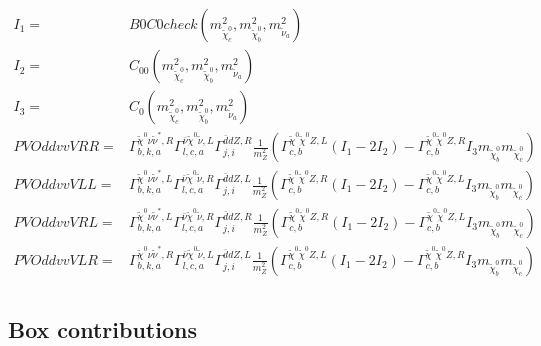 \documentclass[A4,landscape]{article}
\begin{document}
\begin{align} 
I_1= & B0C0check(m^2_{\tilde{\chi}^0_{{c}}}, m^2_{\tilde{\chi}^0_{{b}}}, m^2_{\tilde{\nu}_{{a}}}) \\ 
I_2= & C_{00}(m^2_{\tilde{\chi}^0_{{c}}}, m^2_{\tilde{\chi}^0_{{b}}}, m^2_{\tilde{\nu}_{{a}}}) \\ 
I_3= & C_0(m^2_{\tilde{\chi}^0_{{c}}}, m^2_{\tilde{\chi}^0_{{b}}}, m^2_{\tilde{\nu}_{{a}}}) \\ 
  PVOddvvVRR= &  \Gamma^{\tilde{\chi}^0 \nu \tilde{\nu}^*,R}_{b, k, a} \Gamma^{\bar{\nu}\tilde{\chi}^0 \tilde{\nu} ,L}_{l, c, a} \Gamma^{\bar{d}d Z ,R}_{j, i} \frac{1}{m^2_{Z}} (\Gamma^{\tilde{\chi}^0 \tilde{\chi}^0 Z ,L}_{c, b} (I_1 - 2 I_2) - \Gamma^{\tilde{\chi}^0 \tilde{\chi}^0 Z ,R}_{c, b} I_3 m_{\tilde{\chi}^0_{{b}}} m_{\tilde{\chi}^0_{{c}}}) \\ 
  PVOddvvVLL= &  \Gamma^{\tilde{\chi}^0 \nu \tilde{\nu}^*,L}_{b, k, a} \Gamma^{\bar{\nu}\tilde{\chi}^0 \tilde{\nu} ,R}_{l, c, a} \Gamma^{\bar{d}d Z ,L}_{j, i} \frac{1}{m^2_{Z}} (\Gamma^{\tilde{\chi}^0 \tilde{\chi}^0 Z ,R}_{c, b} (I_1 - 2 I_2) - \Gamma^{\tilde{\chi}^0 \tilde{\chi}^0 Z ,L}_{c, b} I_3 m_{\tilde{\chi}^0_{{b}}} m_{\tilde{\chi}^0_{{c}}}) \\ 
  PVOddvvVRL= &  \Gamma^{\tilde{\chi}^0 \nu \tilde{\nu}^*,L}_{b, k, a} \Gamma^{\bar{\nu}\tilde{\chi}^0 \tilde{\nu} ,R}_{l, c, a} \Gamma^{\bar{d}d Z ,R}_{j, i} \frac{1}{m^2_{Z}} (\Gamma^{\tilde{\chi}^0 \tilde{\chi}^0 Z ,R}_{c, b} (I_1 - 2 I_2) - \Gamma^{\tilde{\chi}^0 \tilde{\chi}^0 Z ,L}_{c, b} I_3 m_{\tilde{\chi}^0_{{b}}} m_{\tilde{\chi}^0_{{c}}}) \\ 
  PVOddvvVLR= &  \Gamma^{\tilde{\chi}^0 \nu \tilde{\nu}^*,R}_{b, k, a} \Gamma^{\bar{\nu}\tilde{\chi}^0 \tilde{\nu} ,L}_{l, c, a} \Gamma^{\bar{d}d Z ,L}_{j, i} \frac{1}{m^2_{Z}} (\Gamma^{\tilde{\chi}^0 \tilde{\chi}^0 Z ,L}_{c, b} (I_1 - 2 I_2) - \Gamma^{\tilde{\chi}^0 \tilde{\chi}^0 Z ,R}_{c, b} I_3 m_{\tilde{\chi}^0_{{b}}} m_{\tilde{\chi}^0_{{c}}}) \\ 
\end{align} 
\subsection{Box contributions} 
\end{document}
